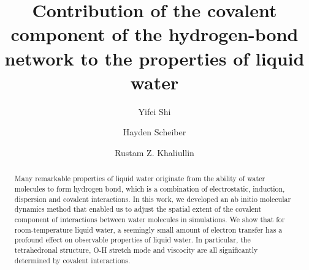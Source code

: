 \documentclass[prl,twocolumn,showpacs]{revtex4}
\begin{document}
\newcommand{\Ang}{\ensuremath{\mathring{\text{A}}}}
\newcommand{\ltwid}{\mathrel{\raise.3ex\hbox{$<$\kern-.75em\lower1ex\hbox{$\sim$}}}}
\newcommand{\gtwid}{\mathrel{\raise.3ex\hbox{$>$\kern-.75em\lower1ex\hbox{$\sim$}}}}
\newcommand{\bra}{\langle}
\newcommand{\ket}{\rangle}
\newcommand{\sill}{\psi}
\newcommand{\trace}{{\rm Tr}}
\newcommand{\ntilde}{\tilde{n}}
\newcommand{\stilde}{\tilde{s}}
\newcommand{\atilde}{\tilde{\alpha}}
\newcommand{\new}{\color{red}}
\newcommand{\old}{\color{black}}
\newcommand{\bea}{\begin{eqnarray}}
\newcommand{\eea}{\end{eqnarray}}
\def\nn{\nonumber\\}



\title{Contribution of the covalent component of the hydrogen-bond network to the properties of liquid water}

\author{Yifei Shi}

\author{Hayden Scheiber}

\author{Rustam Z. Khaliullin}


\begin{abstract}
Many remarkable properties of liquid water originate from the ability of water molecules to form hydrogen bond, which is a combination of electrostatic, induction, dispersion and covalent interactions. In this work, we developed an ab initio molecular dynamics method that enabled us to adjust the spatial extent of the covalent component of interactions between water molecules in simulations. We show that for room-temperature liquid water, a seemingly small amount of electron transfer has a profound effect on observable properties of liquid water. In particular, the tetrahedronal structure, O-H stretch mode and viscocity are all significantly determined by covalent interactions.


\end{abstract}
\maketitle
\end{document}
